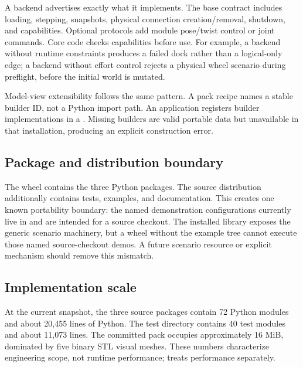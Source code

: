 A backend advertises exactly what it implements. The base contract includes loading,
stepping, snapshots, physical connection creation/removal, shutdown, and capabilities.
Optional protocols add module pose/twist control or joint commands. Core code checks
capabilities before use. For example, a backend without runtime constraints produces a
failed dock rather than a logical-only edge; a backend without effort control rejects a
physical wheel scenario during preflight, before the initial world is mutated.

Model-view extensibility follows the same pattern. A pack recipe names a stable builder
ID, not a Python import path. An application registers builder implementations in a
. Missing builders are valid portable data but unavailable in
that installation, producing an explicit construction error.

\subsection{Package and distribution boundary}

The wheel contains the three Python packages. The source distribution additionally
contains tests, examples, and documentation. This creates one known portability
boundary: the named \smoresep{} demonstration configurations currently live in
 and are intended for a source checkout. The installed
library exposes the generic scenario machinery, but a wheel without the example tree
cannot execute those named source-checkout demos. A future scenario resource or
explicit  mechanism should remove this mismatch.

\subsection{Implementation scale}

At the current snapshot, the three source packages contain 72 Python modules and about
20,455 lines of Python. The test directory contains 40 test modules and about 11,073
lines. The committed \smoresep{} pack occupies approximately 16 MiB, dominated by five
binary STL visual meshes. These numbers characterize engineering scope, not runtime
performance;  treats performance separately.

